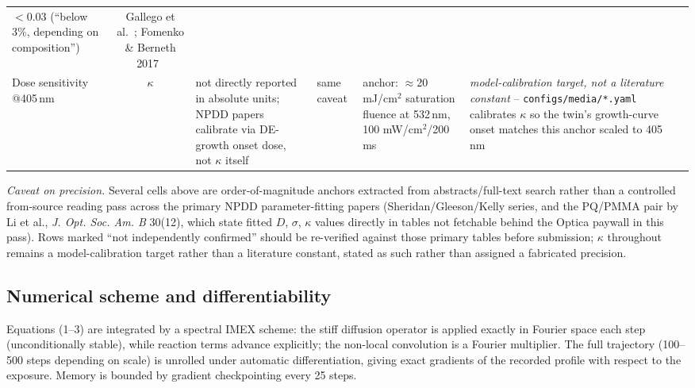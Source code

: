 \documentclass[conference]{IEEEtran}
\begin{document}
\begin{table}[t]
\begin{tabular}{@{}p{2.3cm}cp{3.6cm}p{3.6cm}p{3.3cm}p{4.0cm}@{}}
$<0.03$ (``below 3\%, depending on composition'') &
Gallego et al.~\cite{gallego2008shrinkage}; Fomenko \& Berneth 2017~\cite{fomenko2017bayfol} \\
Dose sensitivity @405\,nm & $\kappa$ &
not directly reported in absolute units; NPDD papers calibrate via DE-growth onset dose, not $\kappa$ itself &
same caveat &
anchor: $\approx$20 mJ/cm$^2$ saturation fluence at 532\,nm, 100 mW/cm$^2$/200\,ms &
\textit{model-calibration target, not a literature constant} -- \texttt{configs/media/*.yaml} calibrates $\kappa$ so the twin's growth-curve onset matches this anchor scaled to 405\,nm~\cite{fomenko2017bayfol} \\
\bottomrule
\end{tabular}
\end{table}

\textit{Caveat on precision.} Several cells above are order-of-magnitude
anchors extracted from abstracts/full-text search rather than a controlled
from-source reading pass across the primary NPDD parameter-fitting papers
(Sheridan/Gleeson/Kelly series, and the PQ/PMMA pair by Li et al., \textit{J.
Opt. Soc. Am. B} 30(12), which state fitted $D$, $\sigma$, $\kappa$ values
directly in tables not fetchable behind the Optica paywall in this pass).
Rows marked ``not independently confirmed'' should be re-verified against
those primary tables before submission; $\kappa$ throughout remains a
model-calibration target rather than a literature constant, stated as such
rather than assigned a fabricated precision.

\subsection{Numerical scheme and differentiability}
Equations (1--3) are integrated by a spectral IMEX scheme: the stiff
diffusion operator is applied exactly in Fourier space each step
(unconditionally stable), while reaction terms advance explicitly; the
non-local convolution is a Fourier multiplier. The full trajectory (100--500
steps depending on scale) is unrolled under automatic differentiation, giving
exact gradients of the recorded profile with respect to the exposure.
Memory is bounded by gradient checkpointing every 25 steps.
\end{document}
